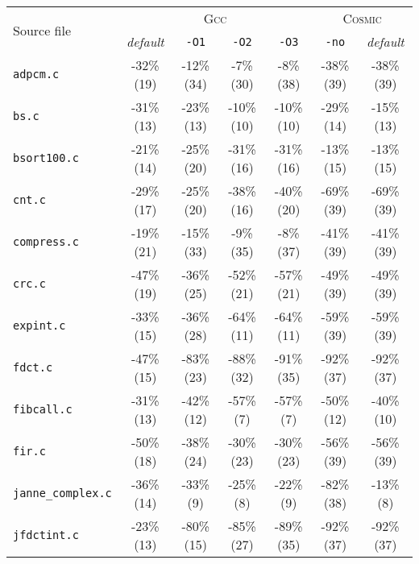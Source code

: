 \begin{tabular}{ |l| |c|c|c|c| |c|c| }
  \hline
  \multirow{2}{*}{Source file}
  & \multicolumn{4}{c||}{\textsc{Gcc}}
  & \multicolumn{2}{c|}{\textsc{Cosmic}}

  \\\cline{2-7}
  & \emph{default} & \verb|-O1|     & \verb|-O2| & \verb|-O3|
  & \verb|-no|     & \emph{default}

  \\\hline
  \verb|adpcm.c|
  & -32\% (19) & -12\% (34) & -7\% (30) & -8\% (38)
  & -38\% (39) & -38\% (39)

  \\\hline
  \verb|bs.c|
  & -31\% (13) & -23\% (13) & -10\% (10) & -10\% (10)
  & -29\% (14) & -15\% (13)

  \\\hline
  \verb|bsort100.c|
  & -21\% (14) & -25\% (20) & -31\% (16) & -31\% (16)
  & -13\% (15) & -13\% (15)

  \\\hline
  \verb|cnt.c|
  & -29\% (17) & -25\% (20) & -38\% (16) & -40\% (20)
  & -69\% (39) & -69\% (39)

  \\\hline
  \verb|compress.c|
  & -19\% (21) & -15\% (33) & -9\% (35) & -8\% (37)
  & -41\% (39) & -41\% (39)

  \\\hline
  \verb|crc.c|
  & -47\% (19) & -36\% (25) & -52\% (21) & -57\% (21)
  & -49\% (39) & -49\% (39)

  \\\hline
  \verb|expint.c|
  & -33\% (15) & -36\% (28) & -64\% (11) & -64\% (11)
  & -59\% (39) & -59\% (39)

  \\\hline
  \verb|fdct.c|
  & -47\% (15) & -83\% (23) & -88\% (32) & -91\% (35)
  & -92\% (37) & -92\% (37)

  \\\hline
  \verb|fibcall.c|
  & -31\% (13) & -42\% (12) & -57\% (7) & -57\% (7)
  & -50\% (12) & -40\% (10)

  \\\hline
  \verb|fir.c|
  & -50\% (18) & -38\% (24) & -30\% (23) & -30\% (23)
  & -56\% (39) & -56\% (39)

  \\\hline
  \verb|janne_complex.c|
  & -36\% (14) & -33\% (9) & -25\% (8) & -22\% (9)
  & -82\% (38) & -13\% (8)

  \\\hline
  \verb|jfdctint.c|
  & -23\% (13) & -80\% (15) & -85\% (27) & -89\% (35)
  & -92\% (37) & -92\% (37)


\end{tabular}
